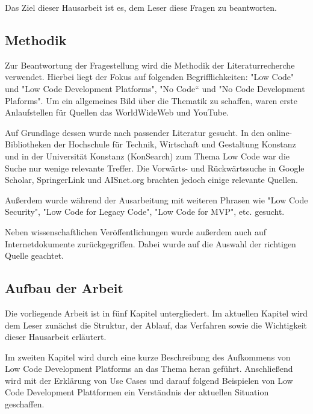 \documentclass[12pt]{article} %
\begin{document}
	Das Ziel dieser Hausarbeit ist es, dem Leser diese Fragen zu beantworten. 
	
	\subsection{Methodik}
	
	
	
	Zur Beantwortung der Fragestellung wird die Methodik der Literaturrecherche verwendet. Hierbei liegt der Fokus auf folgenden Begrifflichkeiten:
	"Low Code" und "Low Code Development Platforms", "No Code“ und "No Code Development Plaforms". 
	Um ein allgemeines Bild über die Thematik zu schaffen, waren erste Anlaufstellen für Quellen das WorldWideWeb und YouTube. \newline
	
	Auf Grundlage dessen wurde nach passender Literatur gesucht. In den online-Bibliotheken der Hochschule für Technik, Wirtschaft und Gestaltung Konstanz und in der Universität Konstanz (KonSearch) zum Thema Low Code war die Suche nur wenige relevante Treffer. Die Vorwärts- und Rückwärtssuche in Google Scholar, SpringerLink und AISnet.org brachten jedoch einige relevante Quellen. 
	
	Außerdem wurde während der Ausarbeitung mit weiteren Phrasen wie "Low Code Security", "Low Code for Legacy Code", "Low Code for MVP", etc. gesucht. \newline 
	 
	Neben wissenschaftlichen Veröffentlichungen wurde außerdem auch auf Internetdokumente zurückgegriffen. Dabei wurde auf die Auswahl der richtigen Quelle geachtet.
	
	\subsection{Aufbau der Arbeit}
	Die vorliegende Arbeit ist in fünf Kapitel untergliedert. Im aktuellen Kapitel wird dem Leser zunächst die Struktur, der Ablauf, das Verfahren sowie die Wichtigkeit dieser Hausarbeit erläutert. \newline
	
	Im zweiten Kapitel wird durch eine kurze Beschreibung des Aufkommens von Low Code Development Platforms an das Thema heran geführt. Anschließend wird mit der Erklärung von Use Cases und darauf folgend Beispielen von Low Code Development Plattformen ein Verständnis der aktuellen Situation geschaffen. \newline
	
\end{document}
